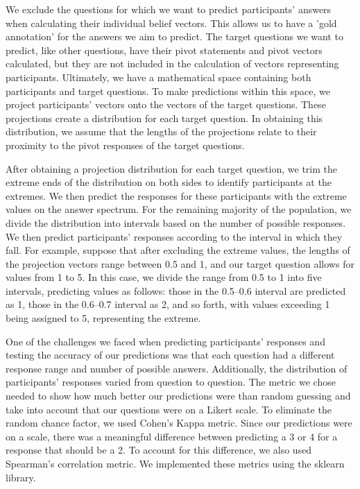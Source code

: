 We exclude the questions for which we want to predict participants' answers when calculating their individual belief vectors. This allows us to have a 'gold annotation' for the answers we aim to predict. The target questions we want to predict, like other questions, have their pivot statements and pivot vectors calculated, but they are not included in the calculation of vectors representing participants. Ultimately, we have a mathematical space containing both participants and target questions. To make predictions within this space, we project participants' vectors onto the vectors of the target questions. These projections create a distribution for each target question. In obtaining this distribution, we assume that the lengths of the projections relate to their proximity to the pivot responses of the target questions.

After obtaining a projection distribution for each target question, we trim the extreme ends of the distribution on both sides to identify participants at the extremes. We then predict the responses for these participants with the extreme values on the answer spectrum. For the remaining majority of the population, we divide the distribution into intervals based on the number of possible responses. We then predict participants' responses according to the interval in which they fall. For example, suppose that after excluding the extreme values, the lengths of the projection vectors range between 0.5 and 1, and our target question allows for values from 1 to 5. In this case, we divide the range from 0.5 to 1 into five intervals, predicting values as follows: those in the 0.5–0.6 interval are predicted as 1, those in the 0.6–0.7 interval as 2, and so forth, with values exceeding 1 being assigned to 5, representing the extreme.

One of the challenges we faced when predicting participants' responses and testing the accuracy of our predictions was that each question had a different response range and number of possible answers. Additionally, the distribution of participants' responses varied from question to question. The metric we chose needed to show how much better our predictions were than random guessing and take into account that our questions were on a Likert scale. To eliminate the random chance factor, we used Cohen's Kappa metric. Since our predictions were on a scale, there was a meaningful difference between predicting a 3 or 4 for a response that should be a 2. To account for this difference, we also used Spearman's correlation metric. We implemented these metrics using the sklearn library.